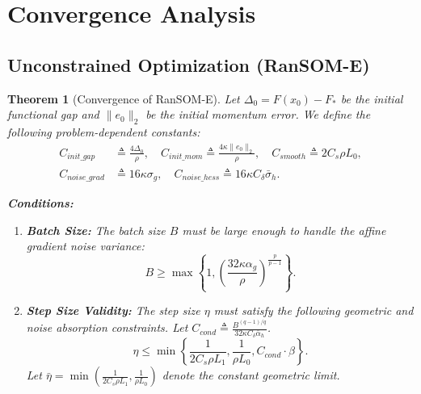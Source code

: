 \documentclass{article}
\theoremstyle{plain}
\newtheorem{theorem}{Theorem}[section]
\theoremstyle{definition}
\theoremstyle{remark}
\begin{document}
\section{Convergence Analysis}

\subsection{Unconstrained Optimization (RanSOM-E)}

\begin{theorem}[Convergence of RanSOM-E]
\label{thm:expsom}
Let $\Delta_0 = F(x_0) - F_*$ be the initial functional gap and $\|e_0\|_2$ be the initial momentum error. We define the following problem-dependent constants:
\begin{align}
    C_{init\_gap} &\triangleq \frac{4\Delta_0}{\rho}, \quad C_{init\_mom} \triangleq \frac{4\kappa \|e_0\|_2}{\rho}, \quad C_{smooth} \triangleq 2 C_s \rho L_0, \\
    C_{noise\_grad} &\triangleq 16\kappa \sigma_g, \quad C_{noise\_hess} \triangleq 16\kappa C_\delta \bar{\sigma}_h.
\end{align}

\textbf{Conditions:}
\begin{enumerate}
    \item \textbf{Batch Size:} The batch size $B$ must be large enough to handle the affine gradient noise variance:
    \begin{equation}
    \label{eq:batch_grad_only}
        B \ge \max\left\{ 1, \left( \frac{32 \kappa \alpha_g}{\rho} \right)^{\frac{p}{p-1}} \right\}.
    \end{equation}
    
    \item \textbf{Step Size Validity:} The step size $\eta$ must satisfy the following geometric and noise absorption constraints. Let $C_{cond} \triangleq \frac{B^{(q-1)/q}}{32 \kappa C_\delta \bar{\alpha}_h}$.
    \begin{equation}
    \label{eq:eta_conditions}
        \eta \le \min\left\{ \frac{1}{2 C_s \rho L_1}, \frac{1}{\rho L_0}, C_{cond} \cdot \beta \right\}.
    \end{equation}
    Let $\bar{\eta} = \min\left( \frac{1}{2 C_s \rho L_1}, \frac{1}{\rho L_0} \right)$ denote the constant geometric limit.
\end{enumerate}


\end{theorem}
\end{document}
